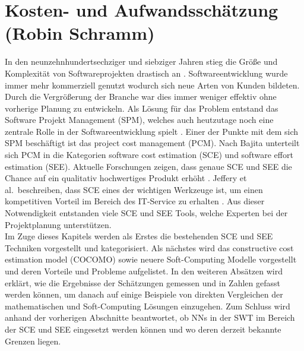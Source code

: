 \section[Kosten- und Aufwandsschätzung (Robin Schramm)]{\large  Kosten- und Aufwandsschätzung (Robin Schramm)} \label{KostenAufwand}
In den neunzehnhundertsechziger und siebziger Jahren stieg die Größe und Komplexität von Softwareprojekten drastisch an \cite{Bajta2018}. Softwareentwicklung wurde immer mehr kommerziell genutzt wodurch sich neue Arten von Kunden bildeten. Durch die Vergrößerung der Branche war dies immer weniger effektiv ohne vorherige Planung zu entwickeln. Als Lösung für das Problem entstand das Software Projekt Management (SPM), welches auch heutzutage noch eine zentrale Rolle in der Softwareentwicklung spielt \cite{Bajta2018}. Einer der Punkte mit dem sich SPM beschäftigt ist das project cost management (PCM). Nach Bajita \cite{Bajta2018} unterteilt sich PCM in die Kategorien software cost estimation (SCE) und software effort estimation (SEE). Aktuelle Forschungen zeigen, dass genaue SCE und SEE die Chance auf ein qualitativ hochwertiges Produkt erhöht \cite{Matson1994}\cite{Bilgaiyan2016}. Jeffery et al.~beschreiben, dass SCE eines der wichtigen Werkzeuge ist, um einen kompetitiven Vorteil im Bereich des IT-Service zu erhalten \cite{Jeffery1990}. Aus dieser Notwendigkeit entstanden viele SCE und SEE Tools, welche Experten bei der Projektplanung unterstützen.
\\
Im Zuge dieses Kapitels werden als Erstes die bestehenden SCE und SEE Techniken vorgestellt und kategorisiert. Als nächstes wird das constructive cost estimation model (COCOMO) sowie neuere Soft-Computing Modelle vorgestellt und deren Vorteile und Probleme aufgelistet. In den weiteren Absätzen wird erklärt, wie die Ergebnisse der Schätzungen gemessen und in Zahlen  gefasst werden können, um danach auf einige Beispiele von direkten Vergleichen der mathematischen und Soft-Computing Lösungen einzugehen. Zum Schluss wird anhand der vorherigen Abschnitte beantwortet, ob NNs in der SWT im Bereich der SCE und SEE eingesetzt werden können und wo deren derzeit bekannte Grenzen liegen.

